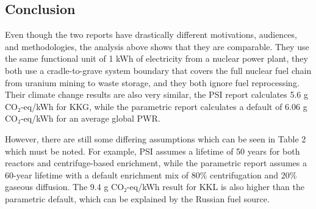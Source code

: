 \documentclass[9pt]{extarticle}
\begin{document}
\subsection{Conclusion}
Even though the two reports have drastically different motivations, audiences, and
methodologies, the analysis above shows that they are comparable. They use the same
functional unit of 1 kWh of electricity from a nuclear power plant, they both use a
cradle-to-grave system boundary that covers the full nuclear fuel chain from uranium
mining to waste storage, and they both ignore fuel reprocessing. Their climate change
results are also very similar, the PSI report calculates 5.6 g CO₂-eq/kWh for KKG, while
the parametric report calculates a default of 6.06 g CO₂-eq/kWh for an average global PWR.

However, there are still some differing assumptions which can be seen in Table 2 which
must be noted. For example, PSI assumes a lifetime of 50 years for both reactors and
centrifuge-based enrichment, while the parametric report assumes a 60-year lifetime
with a default enrichment mix of 80\% centrifugation and 20\% gaseous diffusion. The 9.4
g CO₂-eq/kWh result for KKL is also higher than the parametric default, which can be
explained by the Russian fuel source.
\end{document}
